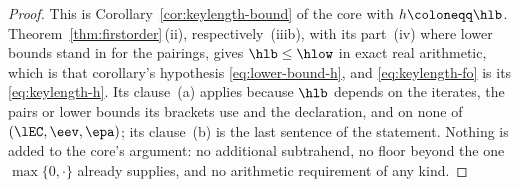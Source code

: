 \begin{proof}
This is Corollary~\ref{cor:keylength-bound} of the core with
$h\coloneqq\hlb$. Theorem~\ref{thm:firstorder}\,(ii), respectively~(iiib),
with its part~(iv) where lower bounds stand in for the pairings, gives
$\hlb\le\hlow$ in exact real arithmetic, which is that corollary's
hypothesis \eqref{eq:lower-bound-h}, and \eqref{eq:keylength-fo} is its
\eqref{eq:keylength-h}. Its clause~(a) applies because $\hlb$ depends on
the iterates, the pairs or lower bounds its brackets use and the
declaration, and on none of $(\lEC,\eev,\epa)$; its clause~(b) is the last
sentence of the statement.
Nothing is added to the core's argument: no additional subtrahend, no
floor beyond the one $\max\{0,\cdot\}$ already supplies, and no arithmetic
requirement of any kind.
\end{proof}
